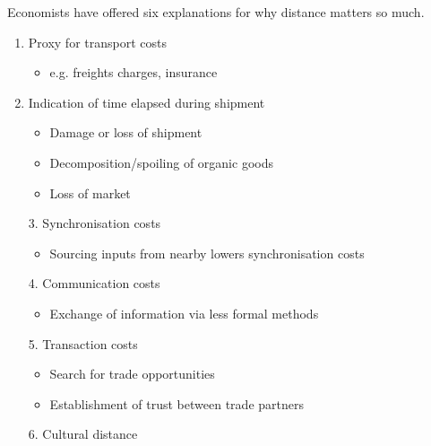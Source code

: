 \documentclass{beamer}
\begin{document}
\begin{frame}
  Economists have offered six explanations for why distance matters so much.
  \medskip
  \begin{enumerate}
    \item Proxy for transport costs
    \begin{itemize}
      \item e.g. freights charges, insurance
    \end{itemize}
    \item Indication of time elapsed during shipment
    \begin{itemize}
      \item Damage or loss of shipment 
      \item Decomposition/spoiling of organic goods
      \item Loss of market
    \end{itemize}
  \end{enumerate}  
\end{frame}

\begin{frame}
  \begin{enumerate}
    \item[3.] Synchronisation costs
    \begin{itemize}
      \item Sourcing inputs from nearby lowers synchronisation costs
    \end{itemize}
    \item[4.] Communication costs
    \begin{itemize}
      \item Exchange of information via less formal methods
    \end{itemize}
    \item [5.] Transaction costs
    \begin{itemize}
      \item Search for trade opportunities
      \item Establishment of trust between trade partners
    \end{itemize}
    \item[6.] Cultural distance
  \end{enumerate}  
\end{frame}
\end{document}
